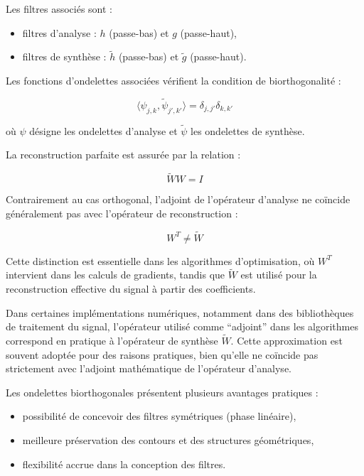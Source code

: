 Les filtres associés sont :
\begin{itemize}[label=-]
\item filtres d'analyse : $h$ (passe-bas) et $g$ (passe-haut),
\item filtres de synthèse : $\tilde{h}$ (passe-bas) et $\tilde{g}$ (passe-haut).
\end{itemize}

Les fonctions d'ondelettes associées vérifient la condition de biorthogonalité :

\begin{equation}
\langle \psi_{j,k}, \tilde{\psi}_{j',k'} \rangle = \delta_{j,j'} \delta_{k,k'}
\end{equation}

où $\psi$ désigne les ondelettes d'analyse et $\tilde{\psi}$ les ondelettes de synthèse.

La reconstruction parfaite est assurée par la relation :

\begin{equation}
\tilde{W} W = I
\end{equation}

Contrairement au cas orthogonal, l'adjoint de l'opérateur d'analyse ne coïncide généralement pas avec l'opérateur de reconstruction :

\begin{equation}
W^T \neq \tilde{W}
\end{equation}

Cette distinction est essentielle dans les algorithmes d'optimisation, où $W^T$ intervient dans les calculs de gradients, tandis que $\tilde{W}$ est utilisé pour la reconstruction effective du signal à partir des coefficients.

Dans certaines implémentations numériques, notamment dans des bibliothèques de traitement du signal, l'opérateur utilisé comme ``adjoint'' dans les algorithmes correspond en pratique à l'opérateur de synthèse $\tilde{W}$. Cette approximation est souvent adoptée pour des raisons pratiques, bien qu'elle ne coïncide pas strictement avec l'adjoint mathématique de l'opérateur d'analyse.

Les ondelettes biorthogonales présentent plusieurs avantages pratiques :
\begin{itemize}[label=-]
\item possibilité de concevoir des filtres symétriques (phase linéaire),
\item meilleure préservation des contours et des structures géométriques,
\item flexibilité accrue dans la conception des filtres.
\end{itemize}

